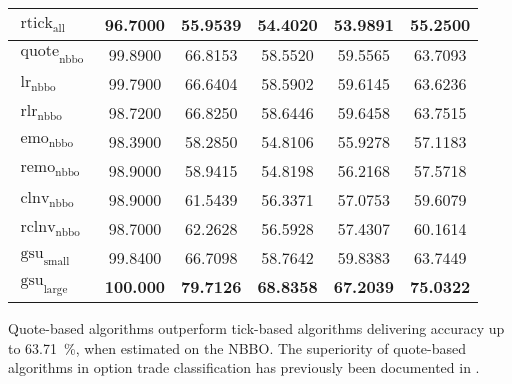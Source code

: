\begin{table}[ht]
\begin{tabular}{@{}lSSSSS@{}}
        $\operatorname{rtick}_{\mathrm{all}}$  & 96.7000           & 55.9539                            & 54.4020           & 53.9891           & 55.2500           \\ \midrule
        $\operatorname{quote}_{\mathrm{nbbo}}$ & 99.8900           & 66.8153                            & 58.5520           & 59.5565           & 63.7093           \\
        $\operatorname{lr}_{\mathrm{nbbo}}$    & 99.7900           & 66.6404                            & 58.5902           & 59.6145           & 63.6236           \\
        $\operatorname{rlr}_{\mathrm{nbbo}}$   & 98.7200           & 66.8250                            & 58.6446           & 59.6458           & 63.7515           \\
        $\operatorname{emo}_{\mathrm{nbbo}}$   & 98.3900           & 58.2850                            & 54.8106           & 55.9278           & 57.1183           \\
        $\operatorname{remo}_{\mathrm{nbbo}}$  & 98.9000           & 58.9415                            & 54.8198           & 56.2168           & 57.5718           \\
        $\operatorname{clnv}_{\mathrm{nbbo}}$  & 98.9000           & 61.5439                            & 56.3371           & 57.0753           & 59.6079           \\
        $\operatorname{rclnv}_{\mathrm{nbbo}}$ & 98.7000           & 62.2628                            & 56.5928           & 57.4307           & 60.1614           \\ \midrule
        $\operatorname{gsu}_{\mathrm{small}}$  & 99.8400           & 66.7098                            & 58.7642           & 59.8383           & 63.7449           \\
        $\operatorname{gsu}_{\mathrm{large}}$  & \bfseries 100.000 & \bfseries 79.7126                  & \bfseries 68.8358 & \bfseries 67.2039 & \bfseries 75.0322 \\
        \bottomrule
    \end{tabular}
\end{table}


Quote-based algorithms outperform tick-based algorithms delivering accuracy up to \SI{63.71}{\percent}, when estimated on the \gls{NBBO}. The superiority of quote-based algorithms in option trade classification has previously been documented in \textcites{savickasInferringDirectionOption2003}{grauerOptionTradeClassification2022}.

